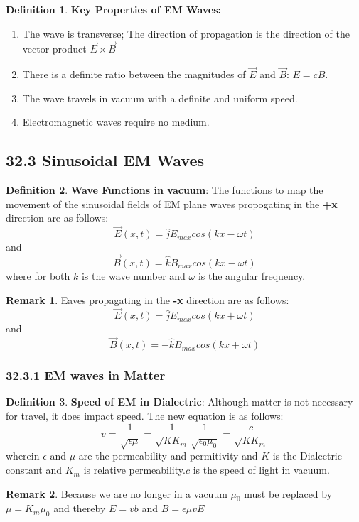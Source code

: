\documentclass[12pt]{amsart}
\theoremstyle{definition}
\newtheorem{definition}{Definition} %
\newtheorem*{remark}{Remark}        %
\numberwithin{equation}{theorem}    %
\begin{document}
\begin{definition}
    \textbf{Key Properties of EM Waves:}
    \begin{enumerate}
        \item The wave is transverse; The direction of propagation is the direction of the vector product $\vec{E} \times \vec{B}$
        \item There is a definite ratio between the magnitudes of $\vec{E}$  and $\vec{B}$: $E = cB$.
        \item The wave travels in vacuum with a definite and uniform speed.
        \item Electromagnetic waves require no medium.
    \end{enumerate}
\end{definition}

\subsection*{32.3 Sinusoidal EM Waves}

\begin{definition}
    \textbf{Wave Functions in vacuum}:
    The functions to map the movement of the sinusoidal fields of EM plane waves propogating in the \textbf{+x} direction are as follows:
    $$\vec{E}(x,t) = \hat{j}E_{max}cos(kx-\omega t)$$
    and 
    $$\vec{B}(x,t) = \hat{k}B_{max}cos(kx-\omega t)$$
    where for both $k$ is the wave number and $\omega$ is the angular frequency.
    \begin{remark}
        Eaves propagating in the \textbf{-x} direction are as follows:
        $$\vec{E}(x,t) = \hat{j}E_{max}cos(kx+\omega t)$$
    and 
    $$\vec{B}(x,t) = -\hat{k}B_{max}cos(kx+\omega t)$$ 
    \end{remark}
\end{definition}

\subsubsection*{32.3.1 EM waves in Matter}

\begin{definition}
    \textbf{Speed of EM in Dialectric}:
    Although matter is not necessary for travel, it does impact speed. The new equation is as follows:
    $$v = \frac{1}{\sqrt{\epsilon\mu}} = \frac{1}{\sqrt{KK_m}}\frac{1}{\sqrt{\epsilon_0\mu_0}} = \frac{c}{\sqrt{KK_m}}$$
    wherein $\epsilon$ and $\mu$ are the permeability and permitivity and $K$ is the Dialectric constant and $K_m$ is relative permeability.$c$ is the speed of light in vacuum.
    \begin{remark}
        Because we are no longer in a vacuum $\mu_0$ must be replaced by $\mu = K_m\mu_0$ and thereby $E = vb$ and $B=\epsilon\mu vE$
    \end{remark}
\end{definition}
\end{document}

